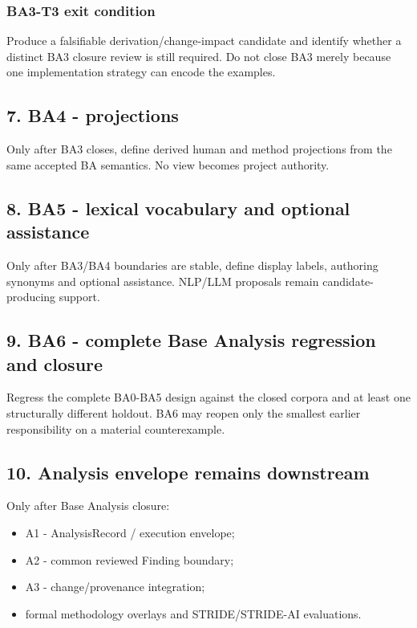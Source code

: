 \documentclass[11pt,a4paper]{article}
\providecommand{\tightlist}{\setlength{\itemsep}{0pt}\setlength{\parskip}{0pt}}\setlength{\emergencystretch}{4em}\hbadness=10000\hfuzz=20pt\sloppy
\begin{document}
\subsubsection{BA3-T3 exit condition}\label{ba3-t3-exit-condition}

Produce a falsifiable derivation/change-impact candidate and identify
whether a distinct BA3 closure review is still required. Do not close
BA3 merely because one implementation strategy can encode the examples.

\subsection{7. BA4 - projections}\label{ba4---projections}

Only after BA3 closes, define derived human and method projections from
the same accepted BA semantics. No view becomes project authority.

\subsection{8. BA5 - lexical vocabulary and optional
assistance}\label{ba5---lexical-vocabulary-and-optional-assistance}

Only after BA3/BA4 boundaries are stable, define display labels,
authoring synonyms and optional assistance. NLP/LLM proposals remain
candidate-producing support.

\subsection{9. BA6 - complete Base Analysis regression and
closure}\label{ba6---complete-base-analysis-regression-and-closure}

Regress the complete BA0-BA5 design against the closed corpora and at
least one structurally different holdout. BA6 may reopen only the
smallest earlier responsibility on a material counterexample.

\subsection{10. Analysis envelope remains
downstream}\label{analysis-envelope-remains-downstream}

Only after Base Analysis closure:

\begin{itemize}
\tightlist
\item
  A1 - AnalysisRecord / execution envelope;
\item
  A2 - common reviewed Finding boundary;
\item
  A3 - change/provenance integration;
\item
  formal methodology overlays and STRIDE/STRIDE-AI evaluations.
\end{itemize}
\end{document}
